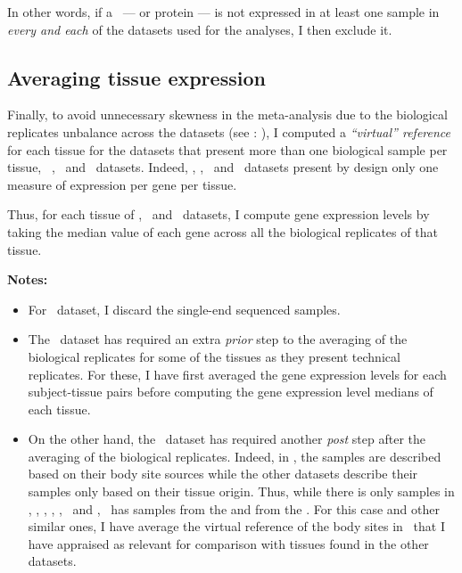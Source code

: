 In other words, if a \mRNA\ --- or protein --- is not expressed in at least
one sample in \emph{every and each} of the datasets used for the analyses,
I then exclude it.

\subsection{Averaging tissue expression}
\label{subsec:averagedTissue}
Finally, to avoid unnecessary skewness in the meta-analysis due to
the biological replicates unbalance across the datasets (see :
),
I computed a \emph{\enquote{virtual} reference} for each tissue
for the datasets that present more than one biological sample per tissue,
\ie\ \vt, \uhlen\ and \gtex\ datasets.
Indeed, \castle, \cutler, \kuster\ and \pandey\ datasets present by design only
one measure of expression per gene per tissue.

Thus, for each tissue of \vt, \uhlen\ and \gtex\ datasets, I compute gene
expression levels by taking the median value of each gene across all the
biological replicates of that tissue.

\textbf{Notes:}
\begin{itemize}[topsep=0pt,nosep]
        \item For \ibm\ dataset, I discard the single-end sequenced samples.
        \item The \uhlen\ dataset has required an extra \emph{prior} step to
            the averaging of the biological replicates
            for some of the tissues as they present technical replicates.
            For these, I have first averaged the gene expression levels
            for each subject-tissue pairs before computing
            the gene expression level medians of each tissue.
        \item On the other hand, the \gtex\ dataset has required another
            \emph{post} step after the averaging of the biological replicates.
            Indeed, in \gtex, the samples are described based on their
            body site sources while the other datasets describe their samples
            only based on their tissue origin.
            Thus, while there is only  samples in \castle, \vt,
            \ibm, \uhlen, \cutler, \kuster\ and \pandey,
            \gtex\ has samples from the 
            and from the .
            For this case and other similar ones,
            I have average the virtual reference of the body sites in \gtex\
            that I have appraised as relevant for comparison with tissues found
            in the other datasets.
\end{itemize}

